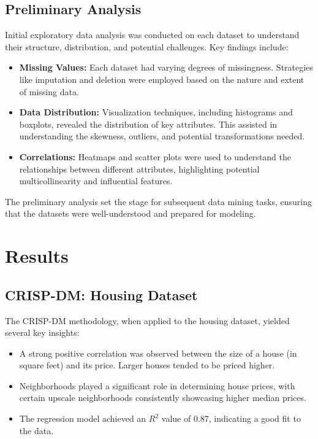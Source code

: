 \documentclass{article}
\begin{document}
\subsection{Preliminary Analysis}
Initial exploratory data analysis was conducted on each dataset to understand their structure, distribution, and potential challenges. Key findings include:

\begin{itemize}
    \item \textbf{Missing Values:} Each dataset had varying degrees of missingness. Strategies like imputation and deletion were employed based on the nature and extent of missing data.
    
    \item \textbf{Data Distribution:} Visualization techniques, including histograms and boxplots, revealed the distribution of key attributes. This assisted in understanding the skewness, outliers, and potential transformations needed.
    
    \item \textbf{Correlations:} Heatmaps and scatter plots were used to understand the relationships between different attributes, highlighting potential multicollinearity and influential features.
\end{itemize}

The preliminary analysis set the stage for subsequent data mining tasks, ensuring that the datasets were well-understood and prepared for modeling.


\section{Results}

\subsection{CRISP-DM: Housing Dataset}
The CRISP-DM methodology, when applied to the housing dataset, yielded several key insights:

\begin{itemize}
    \item A strong positive correlation was observed between the size of a house (in square feet) and its price. Larger houses tended to be priced higher.
    \item Neighborhoods played a significant role in determining house prices, with certain upscale neighborhoods consistently showcasing higher median prices.
    \item The regression model achieved an \( R^2 \) value of 0.87, indicating a good fit to the data.
\end{itemize}
\end{document}
